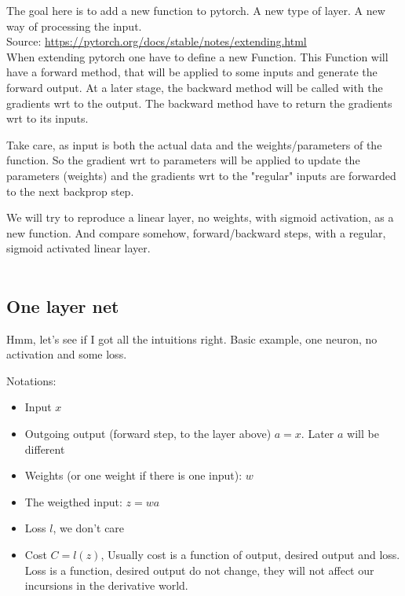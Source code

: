 \documentclass{article}
\begin{document}
The goal here is to add a new function to pytorch. A new type of layer. A new way of processing the input.\\

Source: \url{https://pytorch.org/docs/stable/notes/extending.html}\\

When extending pytorch one have to define a new Function. This Function will have a forward method, that will be applied
to some inputs and generate the forward output. At a later stage, the backward method will be called with the gradients wrt to the output. The backward method have to return the gradients wrt to its inputs.

Take care, as input is both the actual data and the weights/parameters of the function. So the gradient wrt to parameters will be applied to update the parameters (weights) and the gradients wrt to the "regular" inputs are forwarded to the next backprop step.

We will try to reproduce a linear layer, no weights, with sigmoid activation, as a new function. And compare somehow, forward/backward steps, with a regular, sigmoid activated linear layer.\\

\\

\subsection{One layer net}

Hmm, let's see if I got all the intuitions right. Basic example, one neuron, no activation and some loss.

Notations:

\begin{itemize}
	\item Input $x$
	\item Outgoing output (forward step, to the layer above) $a=x$. Later $a$ will be different
	\item Weights (or one weight if there is one input): $w$
	\item The weigthed input: $z =  w a$
	\item Loss $l$, we don't care
	\item Cost $C = l(z)$, Usually cost is a function of output, desired output and loss. Loss is a function, desired output do not change, they will not affect our incursions in the derivative world.
\end{itemize}
\end{document}
